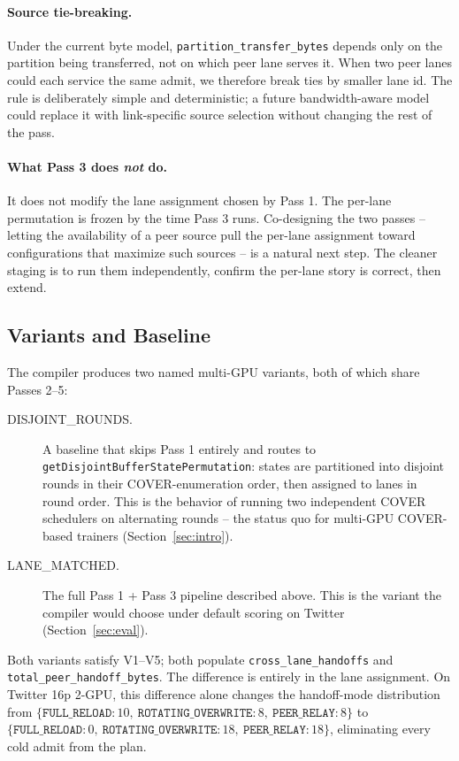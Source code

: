 \paragraph{Source tie-breaking.} Under the current byte model,
\texttt{partition\_transfer\_bytes} depends only on the partition being
transferred, not on which peer lane serves it. When two peer lanes
could each service the same admit, we therefore break ties by smaller
lane id. The rule is deliberately simple and deterministic; a future
bandwidth-aware model could replace it with link-specific source
selection without changing the rest of the pass.

\paragraph{What Pass 3 does \emph{not} do.} It does not modify the
lane assignment chosen by Pass 1. The per-lane permutation is frozen
by the time Pass 3 runs. Co-designing the two passes -- letting the
availability of a peer source pull the per-lane assignment toward
configurations that maximize such sources -- is a natural next step.
The cleaner staging is to run them independently, confirm the per-lane
story is correct, then extend.

\subsection{Variants and Baseline}\label{sec:compiler:variants}

The compiler produces two named multi-GPU variants, both of which
share Passes 2--5:

\begin{description}
\item[\textsc{DISJOINT\_ROUNDS}.] A baseline that skips Pass 1 entirely
and routes to \texttt{getDisjointBufferStatePermutation}: states are
partitioned into disjoint rounds in their COVER-enumeration order,
then assigned to lanes in round order. This is the behavior of running
two independent COVER schedulers on alternating rounds -- the status
quo for multi-GPU COVER-based trainers (Section~\ref{sec:intro}).
\item[\textsc{LANE\_MATCHED}.] The full Pass 1 + Pass 3 pipeline
described above. This is the variant the compiler would choose under
default scoring on Twitter (Section~\ref{sec:eval}).
\end{description}

Both variants satisfy V1--V5; both populate
\texttt{cross\_lane\_handoffs} and \texttt{total\_peer\_handoff\_bytes}.
The difference is entirely in the lane assignment. On Twitter 16p
2-GPU, this difference alone changes the handoff-mode distribution
from $\{\texttt{FULL\_RELOAD}:10,\ \texttt{ROTATING\_OVERWRITE}:8,\
\texttt{PEER\_RELAY}:8\}$ to
$\{\texttt{FULL\_RELOAD}:0,\ \texttt{ROTATING\_OVERWRITE}:18,\
\texttt{PEER\_RELAY}:18\}$, eliminating every cold admit from the plan.

